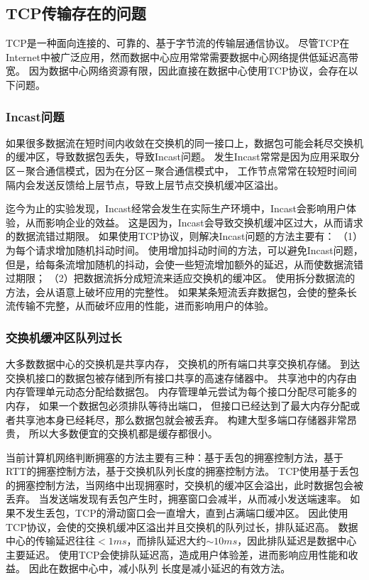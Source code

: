 \subsection{TCP传输存在的问题}
TCP是一种面向连接的、可靠的、基于字节流的传输层通信协议。
尽管TCP在Internet中被广泛应用，然而数据中心应用常常需要数据中心网络提供低延迟高带宽。
因为数据中心网络资源有限，因此直接在数据中心使用TCP协议，会存在以下问题。

\subsubsection{Incast问题}
如果很多数据流在短时间内收敛在交换机的同一接口上，数据包可能会耗尽交换机的缓冲区，导致数据包丢失，导致Incast问题\cite{Vasudevan2009Safe}。
发生Incast常常是因为应用采取分区－聚合通信模式，因为在分区－聚合通信模式中，
工作节点常常在较短时间间隔内会发送反馈给上层节点，导致上层节点交换机缓冲区溢出。

迄今为止的实验发现，Incast经常会发生在实际生产环境中，Incast会影响用户体验，从而影响企业的效益。
这是因为，Incast会导致交换机缓冲区过大，从而请求的数据流错过期限。
如果使用TCP协议，则解决Incast问题的方法主要有：
（1）为每个请求增加随机抖动时间。
使用增加抖动时间的方法，可以避免Incast问题，
但是，给每条流增加随机的抖动，会使一些短流增加额外的延迟，从而使数据流错过期限；
（2）把数据流拆分成短流来适应交换机的缓冲区。
使用拆分数据流的方法，会从语意上破坏应用的完整性。
如果某条短流丢弃数据包，会使的整条长流传输不完整，从而破坏应用的性能，进而影响用户的体验。

\subsubsection{交换机缓冲区队列过长}

大多数数据中心的交换机是共享内存，
交换机的所有端口共享交换机存储。
到达交换机接口的数据包被存储到所有接口共享的高速存储器中。
共享池中的内存由内存管理单元动态分配给数据包。
内存管理单元尝试为每个接口分配尽可能多的内存，
如果一个数据包必须排队等待出端口，
但接口已经达到了最大内存分配或者共享池本身已经耗尽，那么数据包就会被丢弃。
构建大型多端口存储器非常昂贵，
所以大多数便宜的交换机都是缓存都很小。

当前计算机网络判断拥塞的方法主要有三种：基于丢包的拥塞控制方法，基于RTT的拥塞控制方法，基于交换机队列长度的拥塞控制方法。
TCP使用基于丢包的拥塞控制方法，当网络中出现拥塞时，交换机的缓冲区会溢出，此时数据包会被丢弃。
当发送端发现有丢包产生时，拥塞窗口会减半，从而减小发送端速率。
如果不发生丢包，TCP的滑动窗口会一直增大，直到占满端口缓冲区。
因此使用TCP协议，会使的交换机缓冲区溢出并且交换机的队列过长，排队延迟高。
数据中心的传输延迟往往$<1ms$，而排队延迟大约$\sim 10ms$\cite{DCTCP}，因此排队延迟是数据中心主要延迟。
使用TCP会使排队延迟高，造成用户体验差，进而影响应用性能和收益。
因此在数据中心中，减小队列 长度是减小延迟的有效方法。

